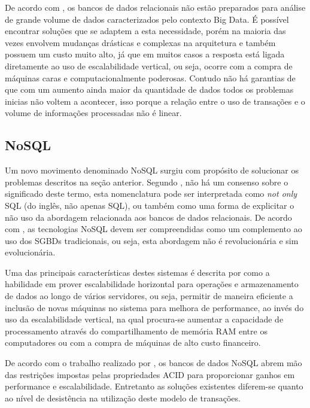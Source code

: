 De acordo com , os bancos de dados relacionais não estão preparados para análise de grande volume de dados caracterizados pelo contexto Big Data. É possível encontrar soluções que se adaptem a esta necessidade, porém na maioria das vezes envolvem mudanças drásticas e complexas na arquitetura e também possuem um custo muito alto, já que em muitos casos a resposta está ligada diretamente ao uso de escalabilidade vertical, ou seja, ocorre com a compra de máquinas caras e computacionalmente poderosas. Contudo não há garantias de que com um aumento ainda maior da quantidade de dados todos os problemas inicias não voltem a acontecer, isso porque a relação entre o uso de transações e o volume de informações processadas não é linear.

\subsection{NoSQL}

Um novo movimento denominado NoSQL surgiu com propósito de solucionar os problemas  descritos na seção anterior. Segundo , não há um consenso sobre o significado deste termo, esta nomenclatura pode ser interpretada como \textit{not only} SQL (do inglês, não apenas SQL), ou também como uma forma de explicitar o não uso da abordagem relacionada aos bancos de dados relacionais. De acordo com , as tecnologias NoSQL devem ser compreendidas como um complemento ao uso dos SGBDs tradicionais, ou seja, esta abordagem não é revolucionária e sim evolucionária. 

Uma das principais características destes sistemas é descrita por  como a habilidade em prover escalabilidade horizontal para operações e armazenamento de dados ao longo de vários servidores, ou seja, permitir de maneira eficiente a inclusão de novas máquinas no sistema para melhora de performance, ao invés do uso da escalabilidade vertical, na qual procura-se aumentar a capacidade de processamento através do compartilhamento de memória RAM entre os computadores ou com a compra de máquinas de alto custo financeiro.

De acordo com o trabalho realizado por , os bancos de dados NoSQL abrem mão das restrições impostas pelas propriedades ACID para proporcionar ganhos em performance e escalabilidade. Entretanto as soluções existentes diferem-se quanto ao nível de desistência na utilização deste modelo de transações.

